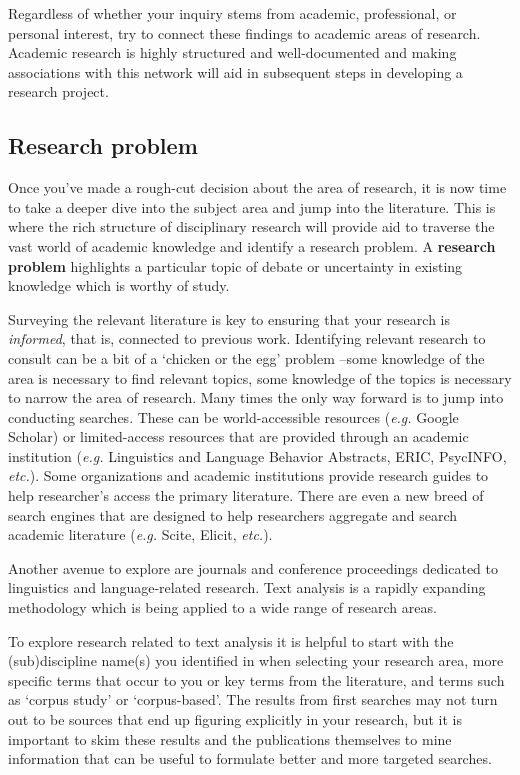 \documentclass[
  letterpaper,
]{latex/krantz}
\theoremstyle{definition}
\theoremstyle{remark}
\begin{document}
Regardless of whether your inquiry stems from academic, professional, or
personal interest, try to connect these findings to academic areas of
research. Academic research is highly structured and well-documented and
making associations with this network will aid in subsequent steps in
developing a research project.

\subsection{Research problem}\label{sec-fr-problem}

Once you've made a rough-cut decision about the area of research, it is
now time to take a deeper dive into the subject area and jump into the
literature. This is where the rich structure of disciplinary research
will provide aid to traverse the vast world of academic knowledge and
identify a research problem. A \textbf{research problem} highlights a
particular topic of debate or uncertainty in existing knowledge which is
worthy of study.

Surveying the relevant literature is key to ensuring that your research
is \emph{informed}, that is, connected to previous work. Identifying
relevant research to consult can be a bit of a `chicken or the egg'
problem --some knowledge of the area is necessary to find relevant
topics, some knowledge of the topics is necessary to narrow the area of
research. Many times the only way forward is to jump into conducting
searches. These can be world-accessible resources (\emph{e.g.} Google
Scholar) or limited-access resources that are provided through an
academic institution (\emph{e.g.} Linguistics and Language Behavior
Abstracts, ERIC, PsycINFO, \emph{etc.}). Some organizations and academic
institutions provide research guides to help researcher's access the
primary literature. There are even a new breed of search engines that
are designed to help researchers aggregate and search academic
literature (\emph{e.g.} Scite, Elicit, \emph{etc.}).

Another avenue to explore are journals and conference proceedings
dedicated to linguistics and language-related research. Text analysis is
a rapidly expanding methodology which is being applied to a wide range
of research areas.

To explore research related to text analysis it is helpful to start with
the (sub)discipline name(s) you identified in when selecting your
research area, more specific terms that occur to you or key terms from
the literature, and terms such as `corpus study' or `corpus-based'. The
results from first searches may not turn out to be sources that end up
figuring explicitly in your research, but it is important to skim these
results and the publications themselves to mine information that can be
useful to formulate better and more targeted searches.
\end{document}
